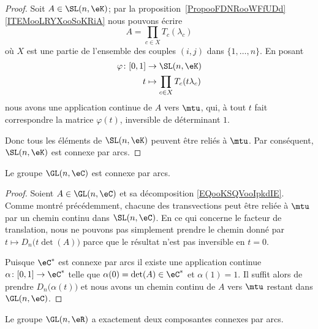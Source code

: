 \begin{proof}
	Soit \( A\in \SL(n,\eK)\); par la proposition~\ref{PropooFDNRooWFfUDd}\ref{ITEMooLRYXooSoKRiA} nous pouvons écrire
	\begin{equation}
		A=\prod_{c\in X}T_c(\lambda_c)
	\end{equation}
	où \( X\) est une partie de l'ensemble des couples \( (i,j)\) dans \( \{ 1,\ldots, n \}\). En posant
	\begin{equation}
		\begin{aligned}
			\varphi\colon \mathopen[ 0 , 1 \mathclose] & \to \SL(n,\eK)                        \\
			t                                          & \mapsto \prod_{c\in X}T_c(t\lambda_c)
		\end{aligned}
	\end{equation}
	nous avons une application continue de \( A\) vers \( \mtu\), qui, à tout \( t\) fait correspondre la matrice \( \varphi(t)\), inversible de déterminant \( 1\).

	Donc tous les éléments de \( \SL(n,\eK)\) peuvent être reliés à \( \mtu\). Par conséquent, \( \SL(n,\eK)\) est connexe par arcs.
\end{proof}

\begin{proposition}\label{PROPooVJNIooMByUJQ}
	Le groupe \( \GL(n,\eC)\) est connexe par arcs.
\end{proposition}

\begin{proof}
	Soient \( A\in\GL(n,\eC)\) et sa décomposition \eqref{EQooKSQVooIpkdIE}. Comme montré précédemment, chacune des transvections peut être reliée à \( \mtu\) par un chemin continu dans \( \SL(n,\eC)\). En ce qui concerne le facteur de translation,  nous ne pouvons pas simplement prendre le chemin donné par \( t\mapsto D_n\big( t\det(A) \big)\) parce que le résultat n'est pas inversible en \( t=0\).

	Puisque \( \eC^*\) est connexe par arcs il existe une application continue \( \alpha\colon \mathopen[ 0 , 1 \mathclose]\to \eC^*\) telle que \( \alpha(0)=\det(A)\in \eC^*\) et \( \alpha(1)=1\). Il suffit alors de prendre \( D_n\big( \alpha(t) \big)\) et nous avons un chemin continu de \( A\) vers \( \mtu\) restant dans \( \GL(n,\eC)\).
\end{proof}

\begin{proposition} \label{PROPooBIYQooWLndSW}
	Le groupe \( \GL(n,\eR)\) a exactement deux composantes connexes par arcs.
\end{proposition}

